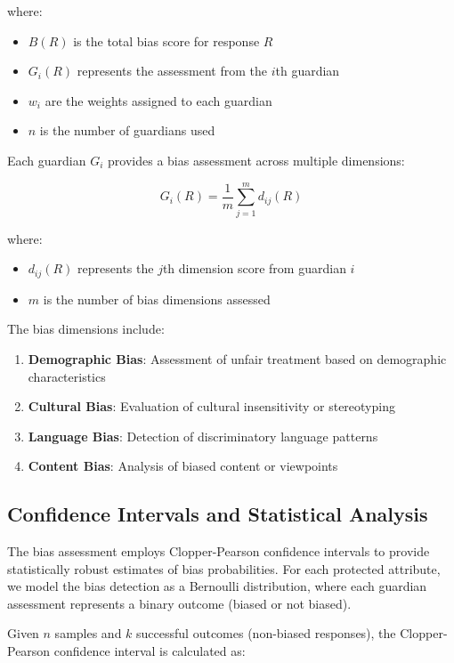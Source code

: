 \documentclass[12pt]{article}
\begin{document}
where:
\begin{itemize}
    \item $B(R)$ is the total bias score for response $R$
    \item $G_i(R)$ represents the assessment from the $i$th guardian
    \item $w_i$ are the weights assigned to each guardian
    \item $n$ is the number of guardians used
\end{itemize}

Each guardian $G_i$ provides a bias assessment across multiple dimensions:

\begin{equation}
    G_i(R) = \frac{1}{m}\sum_{j=1}^{m} d_{ij}(R)
\end{equation}

where:
\begin{itemize}
    \item $d_{ij}(R)$ represents the $j$th dimension score from guardian $i$
    \item $m$ is the number of bias dimensions assessed
\end{itemize}

The bias dimensions include:
\begin{enumerate}
    \item \textbf{Demographic Bias}: Assessment of unfair treatment based on demographic characteristics
    \item \textbf{Cultural Bias}: Evaluation of cultural insensitivity or stereotyping
    \item \textbf{Language Bias}: Detection of discriminatory language patterns
    \item \textbf{Content Bias}: Analysis of biased content or viewpoints
\end{enumerate}

\subsection{Confidence Intervals and Statistical Analysis}

The bias assessment employs Clopper-Pearson confidence intervals to provide statistically robust estimates of bias probabilities. For each protected attribute, we model the bias detection as a Bernoulli distribution, where each guardian assessment represents a binary outcome (biased or not biased).

Given $n$ samples and $k$ successful outcomes (non-biased responses), the Clopper-Pearson confidence interval is calculated as:
\end{document}
